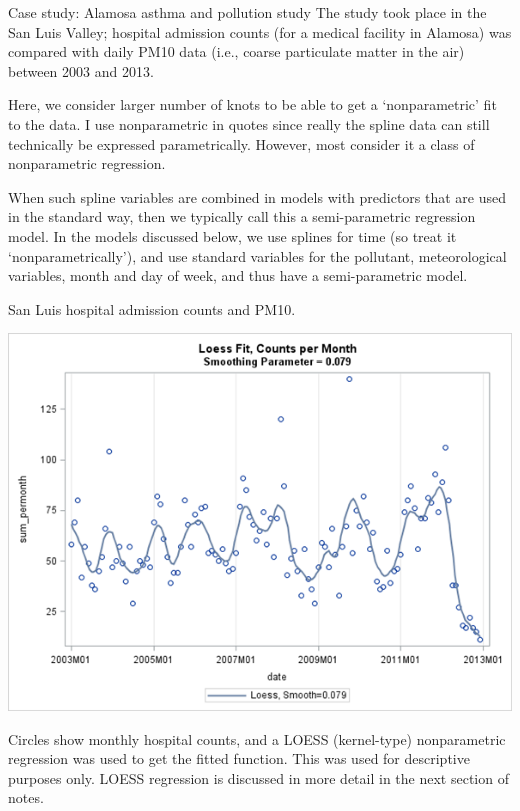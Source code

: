\documentclass[
  9pt,
  ignorenonframetext,
]{beamer}
\begin{document}
\begin{frame}{Case study: Alamosa asthma and pollution study}
\protect\hypertarget{case-study-alamosa-asthma-and-pollution-study}{}
The study took place in the San Luis Valley; hospital admission counts
(for a medical facility in Alamosa) was compared with daily PM10 data
(i.e., coarse particulate matter in the air) between 2003 and 2013.

Here, we consider larger number of knots to be able to get a
`nonparametric' fit to the data. I use nonparametric in quotes since
really the spline data can still technically be expressed
parametrically. However, most consider it a class of nonparametric
regression.

When such spline variables are combined in models with predictors that
are used in the standard way, then we typically call this a
semi-parametric regression model. In the models discussed below, we use
splines for time (so treat it `nonparametrically'), and use standard
variables for the pollutant, meteorological variables, month and day of
week, and thus have a semi-parametric model.
\end{frame}

\begin{frame}{San Luis hospital admission counts and PM10.}
\protect\hypertarget{san-luis-hospital-admission-counts-and-pm10.}{}
\begin{center}\includegraphics[width=0.7\linewidth]{figs_L12/f15} \end{center}

Circles show monthly hospital counts, and a LOESS (kernel-type)
nonparametric regression was used to get the fitted function. This was
used for descriptive purposes only. LOESS regression is discussed in
more detail in the next section of notes.
\end{frame}
\end{document}
